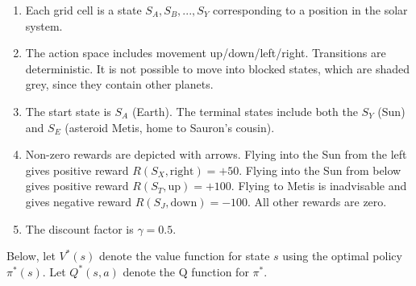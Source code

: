 \documentclass[11pt,addpoints,answers]{exam}
\newcommand{\solo}{\textbf{[SOLO]} }
\begin{document}
\begin{questions}
\begin{enumerate}
    \item Each grid cell is a state $S_A, S_B,..., S_Y$ corresponding to a position in the solar system.
    \item The action space includes movement up/down/left/right.
Transitions are deterministic. It is not possible to move into blocked states, which are shaded grey, since they contain other planets.
    \item The start state is $S_A$ (Earth). The terminal states include both the $S_Y$ (Sun) and $S_E$ (asteroid Metis, home to Sauron's cousin).
    \item Non-zero rewards are depicted with arrows.  Flying into the Sun from the left gives positive reward $R(S_X, \text{right}) = +50$. Flying into the Sun from below gives positive reward $R(S_T, \text{up}) = +100$. Flying to Metis is inadvisable and gives negative reward $R(S_J, \text{down}) = -100$. All other rewards are zero.
    \item The discount factor is $\gamma = 0.5$.
\end{enumerate}

    
Below, let $V^*(s)$ denote the value function for state $s$ using the optimal policy $\pi^*(s)$. Let $Q^*(s,a)$ denote the Q function for $\pi^*$.

\clearpage

\end{questions}
\end{document}
